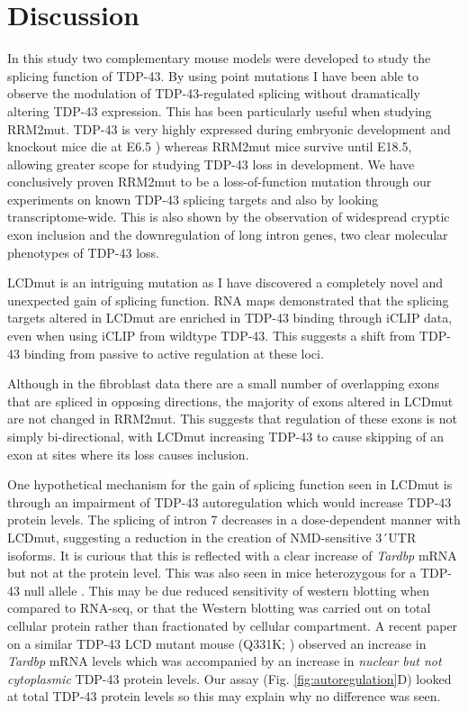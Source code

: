 \clearpage

\section{Discussion}

In this study  two complementary mouse models were developed to study the splicing function of TDP-43. 
By using point mutations I have been able to observe the modulation of TDP-43-regulated splicing without dramatically altering TDP-43 expression. 
This has been particularly useful when studying RRM2mut. 
TDP-43 is very highly expressed during embryonic development and knockout mice die at E6.5 \citep{Ricketts2014}) whereas RRM2mut mice survive until E18.5, allowing greater scope for studying TDP-43 loss in development.
We have conclusively proven RRM2mut to be a loss-of-function mutation through our experiments on known TDP-43 splicing targets and also by looking transcriptome-wide. 
This is also shown by the observation of widespread cryptic exon inclusion and the downregulation of long intron genes, two clear molecular phenotypes of TDP-43 loss.

LCDmut is an intriguing mutation as I have discovered a completely novel and unexpected gain of splicing function. 
RNA maps demonstrated that the splicing targets altered in LCDmut are enriched in TDP-43 binding through iCLIP data, even when using iCLIP from wildtype TDP-43. 
This suggests a shift from TDP-43 binding from passive to active regulation at these loci.

Although in the fibroblast data there are a small number of overlapping exons that are spliced in opposing directions, the majority of exons altered in LCDmut are not changed in RRM2mut. 
This suggests that regulation of these exons is not simply bi-directional, with LCDmut increasing TDP-43 to cause skipping of an exon at sites where its loss causes inclusion.

One hypothetical mechanism for the gain of splicing function seen in LCDmut is through an impairment of TDP-43 autoregulation which would increase TDP-43 protein levels.
The splicing of intron 7 decreases in a dose-dependent manner with LCDmut, suggesting a reduction in the creation of NMD-sensitive 3\'\ UTR isoforms.
It is curious that this is reflected with a clear increase of \textit{Tardbp} mRNA but not at the protein level.
This was also seen in mice heterozygous for a TDP-43 null allele \citep{Ricketts2014}.
This may be due reduced sensitivity of western blotting when compared to RNA-seq, or that the Western blotting was carried out on total cellular protein rather than fractionated by cellular compartment.
A recent paper on a similar TDP-43 LCD mutant mouse (Q331K; \cite{White2018}) observed an increase in \textit{Tardbp} mRNA levels which was accompanied by an increase in \textit{nuclear but not cytoplasmic} TDP-43 protein levels.
Our assay (Fig. \ref{fig:autoregulation}D) looked at total TDP-43 protein levels so this may explain why no difference was seen. 

